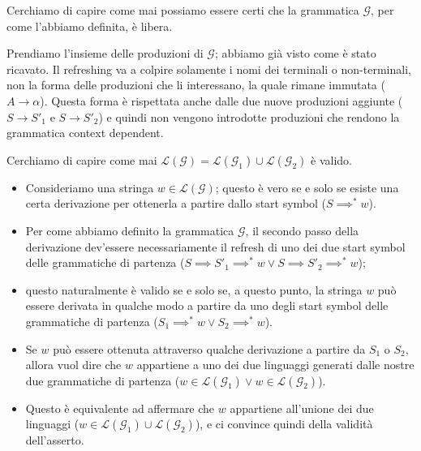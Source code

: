 \documentclass[class=book, crop=false, oneside, 12pt]{standalone}
\begin{document}
\begin{osservazione}
  Cerchiamo di capire come mai possiamo essere certi che la grammatica \(\mathcal{G}\), per come l'abbiamo definita, è libera.

  Prendiamo l'insieme delle produzioni di \(\mathcal{G}\); abbiamo già visto come è stato ricavato. Il refreshing va a colpire solamente i nomi dei terminali o non-terminali, non la forma delle produzioni che li interessano, la quale rimane immutata (\(A \rightarrow \alpha\)). Questa forma è rispettata anche dalle due nuove produzioni aggiunte (\(S \rightarrow S'_1\) e \(S \rightarrow S'_2\)) e quindi non vengono introdotte produzioni che rendono la grammatica context dependent.

\end{osservazione}

\begin{osservazione}
  Cerchiamo di capire come mai  \(\mathcal{L(G)} = \mathcal{L}(\mathcal{G}_1)  \cup \mathcal{L}(\mathcal{G}_2) \) è valido.
  \begin{itemize}
    \item Consideriamo una stringa \(w \in \mathcal{L(G)}\); questo è vero se e solo se esiste una certa derivazione per ottenerla a partire dallo start symbol (\(S \implies^* w\)).
    \item Per come abbiamo definito la grammatica \(\mathcal{G}\), il secondo passo della derivazione dev'essere necessariamente il refresh di uno dei due start symbol delle grammatiche di partenza (\(S \implies S'_1 \implies^* w \lor S \implies S'_2 \implies^* w\));
    \item questo naturalmente è valido se e solo se, a questo punto, la stringa \(w\) può essere derivata in qualche modo a partire da uno degli start symbol delle grammatiche di partenza (\(S_1 \implies^* w \lor S_2 \implies^* w\)).
    \item Se \(w\) può essere ottenuta attraverso qualche derivazione a partire da \(S_1\) o \(S_2\), allora vuol dire che \(w\) appartiene a uno dei due linguaggi generati dalle nostre due grammatiche di partenza (\(w \in \mathcal{L}(\mathcal{G}_1)  \lor w \in \mathcal{L}(\mathcal{G}_2) \)).
    \item Questo è equivalente ad affermare che \(w\) appartiene all'unione dei due linguaggi (\(w \in \mathcal{L}(\mathcal{G}_1)  \cup \mathcal{L}(\mathcal{G}_2) \)), e ci convince quindi della validità dell'asserto.
  \end{itemize}
\end{osservazione}
\end{document}
